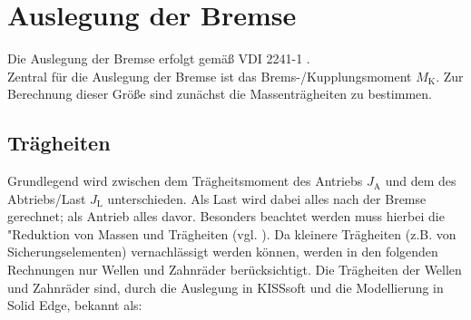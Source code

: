 \section{Auslegung der Bremse}
Die Auslegung der Bremse erfolgt gemäß VDI 2241-1 \cite{VDI2241-1}. \\
Zentral für die Auslegung der Bremse ist das Brems-/Kupplungsmoment $M_\mathrm{K}$. Zur Berechnung dieser Größe sind zunächst die Massenträgheiten zu bestimmen.  

\subsection{Trägheiten}
Grundlegend wird zwischen dem Trägheitsmoment des Antriebs $J_\mathrm{A}$ und dem des Abtriebs/Last $J_\mathrm{L}$ unterschieden. Als Last wird dabei alles nach der Bremse gerechnet; als Antrieb alles davor. Besonders beachtet werden muss hierbei die "Reduktion von Massen und Trägheiten (vgl. \cite[S. 268f.]{Sauer}). Da kleinere Trägheiten (z.B. von Sicherungselementen) vernachlässigt werden können, werden in den folgenden Rechnungen nur Wellen und Zahnräder berücksichtigt. 
Die Trägheiten der Wellen und Zahnräder sind, durch die Auslegung in KISSsoft und die Modellierung in Solid Edge, bekannt als: 

